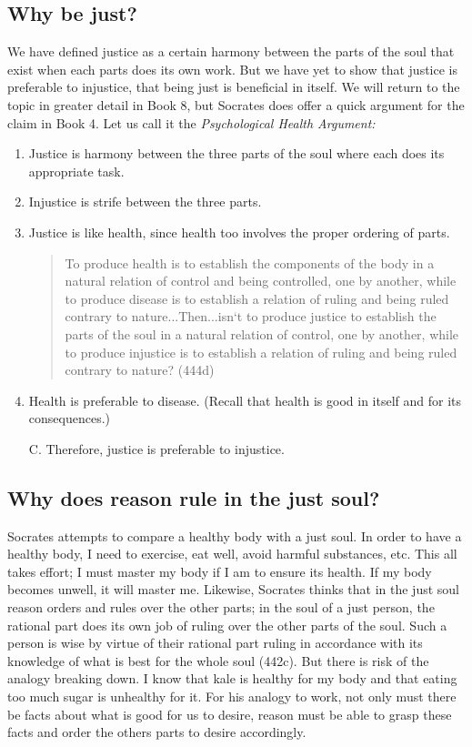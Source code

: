 \documentclass[oneside]{article}
\begin{document}
\thispagestyle{fancy}

\subsection*{Why be just?}
We have defined justice as a certain harmony between the parts of the soul that exist when each parts does its own work. But we have yet to show that justice is preferable to injustice, that being just is beneficial in itself. We will return to the topic in greater detail in Book 8, but Socrates does offer a quick argument for the claim in Book 4. Let us call it the \emph{Psychological Health Argument:}

\begin{enumerate}
\item Justice is harmony between the three parts of the soul where each does its appropriate task.
\item Injustice is strife between the three parts.
\item	Justice is like health, since health too involves the proper ordering of parts.  
\begin{quote}
To produce health is to establish the components of the body in a natural relation of control and being controlled, one by another, while to produce disease is to establish a relation of ruling and being ruled contrary to nature...Then...isn`t to produce justice to establish the parts of the soul in a natural relation of control, one by another, while to produce injustice is to establish a relation of ruling and being ruled contrary to nature? (444d)
\end{quote}
\item  Health is preferable to disease.  (Recall that health is good in itself and for its consequences.)
\item[C.]	Therefore, justice is preferable to injustice.
\end{enumerate}

\subsection*{Why does reason rule in the just soul?}
Socrates attempts to compare a healthy body with a just soul. In order to have a healthy body, I need to exercise, eat well, avoid harmful substances, etc. This all takes effort; I must master my body if I am to ensure its health. If my body becomes unwell, it will master me. Likewise, Socrates thinks that in the just soul reason orders and rules over the other parts; in the soul of a just person, the rational part does its own job of ruling over the other parts of the soul. Such a person is wise by virtue of their rational part ruling in accordance with its knowledge of what is best for the whole soul (442c).   But there is risk of the analogy breaking down. I know that kale is healthy for my body and that eating too much sugar is unhealthy for it. For his analogy to work, not only must there be facts about what is good for us to desire, reason must be able to grasp these facts and order the others parts to desire accordingly. 
\end{document}
